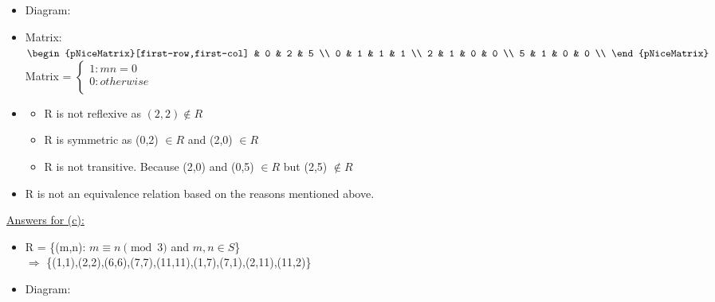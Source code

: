 \documentclass{article}
\begin{document}
\begin{enumerate}
\begin{itemize}
    \item Diagram:\\

    \item Matrix:\\
        $\begin{pNiceMatrix}[first-row,first-col]
           & 0 & 2 & 5        \\
        0  & 1 & 1 & 1        \\ 
        2  & 1 & 0 & 0        \\
        5  & 1 & 0 & 0        \\
        \end{pNiceMatrix}$
        \hspace{1cm} Matrix = 
        $\begin{cases}
            1: mn = 0 \\
            0: otherwise\\  
        \end{cases}$ \\
    
    \item \begin{itemize}
       \item R is not reflexive as $(2,2) \notin R$ 
       \item R is symmetric as (0,2) $\in R$ and (2,0) $\in R$
        \item R is not transitive. Because (2,0) and (0,5) $\in R$ but (2,5) $\notin R$  
     \end{itemize}
    \item R is not an equivalence relation based on the reasons mentioned above.
    
\end{itemize}

\pagebreak %

\underline{Answers for (c):}    

\begin{itemize}
    \item R = \{(m,n): $m \equiv n \pmod{3}$ and $m,n \in S$\}
    \\$\Rightarrow$ \{(1,1),(2,2),(6,6),(7,7),(11,11),(1,7),(7,1),(2,11),(11,2)\}\\

    \item Diagram:\\


\end{itemize}
\end{enumerate}
\end{document}
